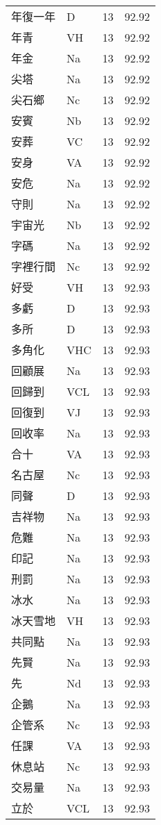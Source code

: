\documentclass[twocolumn]{book}
\begin{document}
\begin{supertabular}{llrr}
年復一年 & D & 13 &  92.92\\
年青 & VH & 13 &  92.92\\
年金 & Na & 13 &  92.92\\
尖塔 & Na & 13 &  92.92\\
尖石鄉 & Nc & 13 &  92.92\\
安賓 & Nb & 13 &  92.92\\
安葬 & VC & 13 &  92.92\\
安身 & VA & 13 &  92.92\\
安危 & Na & 13 &  92.92\\
守則 & Na & 13 &  92.92\\
宇宙光 & Nb & 13 &  92.92\\
字碼 & Na & 13 &  92.92\\
字裡行間 & Nc & 13 &  92.92\\
好受 & VH & 13 &  92.93\\
多虧 & D & 13 &  92.93\\
多所 & D & 13 &  92.93\\
多角化 & VHC & 13 &  92.93\\
回顧展 & Na & 13 &  92.93\\
回歸到 & VCL & 13 &  92.93\\
回復到 & VJ & 13 &  92.93\\
回收率 & Na & 13 &  92.93\\
合十 & VA & 13 &  92.93\\
名古屋 & Nc & 13 &  92.93\\
同聲 & D & 13 &  92.93\\
吉祥物 & Na & 13 &  92.93\\
危難 & Na & 13 &  92.93\\
印記 & Na & 13 &  92.93\\
刑罰 & Na & 13 &  92.93\\
冰水 & Na & 13 &  92.93\\
冰天雪地 & VH & 13 &  92.93\\
共同點 & Na & 13 &  92.93\\
先賢 & Na & 13 &  92.93\\
先 & Nd & 13 &  92.93\\
企鵝 & Na & 13 &  92.93\\
企管系 & Nc & 13 &  92.93\\
任課 & VA & 13 &  92.93\\
休息站 & Nc & 13 &  92.93\\
交易量 & Na & 13 &  92.93\\
立於 & VCL & 13 &  92.93\\

\end{supertabular}
\end{document}

